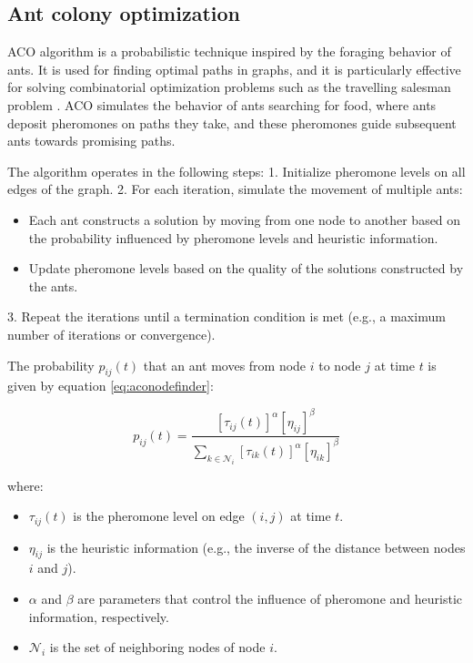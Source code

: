 \documentclass[12pt]{report}
\begin{document}
        \subsection{Ant colony optimization}
        \ac{ACO} algorithm is a probabilistic technique inspired by the foraging behavior of ants. It is used for
        finding optimal paths in graphs, and it is particularly effective for solving combinatorial optimization
        problems such as the travelling salesman problem \cite{dorigo_ant_2007}. ACO simulates the behavior of ants
        searching for food, where ants deposit pheromones on paths they take, and these pheromones guide subsequent ants
        towards promising paths.
            
        The algorithm operates in the following steps: 1. Initialize pheromone levels on all edges of the graph. 2. For
        each iteration, simulate the movement of multiple ants:
           \begin{itemize}
             \item Each ant constructs a solution by moving from one node to another based on the probability influenced
             by pheromone levels and heuristic information.
             \item Update pheromone levels based on the quality of the solutions constructed by the ants.
           \end{itemize}
        3. Repeat the iterations until a termination condition is met (e.g., a maximum number of iterations or
        convergence).
       
        The probability \( p_{ij}(t) \) that an ant moves from node \( i \) to node \( j \) at time \( t \) is given by
        equation \ref{eq:aconodefinder}:

        \begin{equation}\label{eq:aconodefinder}
        p_{ij}(t) = \frac{[\tau_{ij}(t)]^\alpha [\eta_{ij}]^\beta}{\sum_{k \in \mathcal{N}_i} [\tau_{ik}(t)]^\alpha [\eta_{ik}]^\beta}
        \end{equation}

        where:
        \begin{itemize}
          \item \( \tau_{ij}(t) \) is the pheromone level on edge \( (i, j) \) at time \( t \).
          \item \( \eta_{ij} \) is the heuristic information (e.g., the inverse of the distance between nodes \( i \)
          and \( j \)).
          \item \( \alpha \) and \( \beta \) are parameters that control the influence of pheromone and heuristic
          information, respectively.
          \item \( \mathcal{N}_i \) is the set of neighboring nodes of node \( i \).
        \end{itemize}
        
\end{document}
